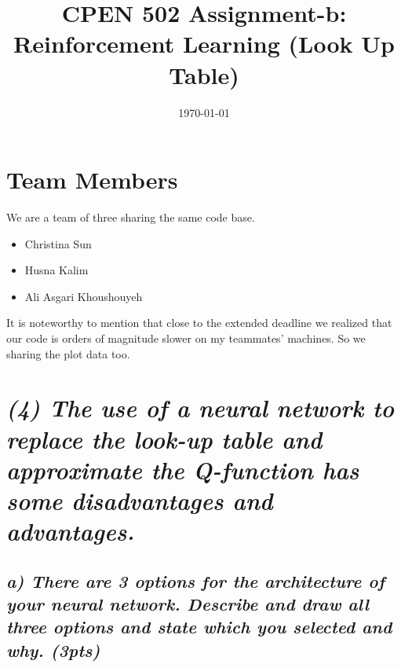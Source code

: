 \documentclass[a4paper,12pt]{article}
\title{CPEN 502 Assignment-b: Reinforcement Learning (Look Up Table)}
\author{\authorName}
\date{\today}
\begin{document}
\maketitle

\section*{Team Members}
We are a team of three sharing the same code base. 
\begin{itemize}
\item Christina Sun
\item Husna Kalim
\item Ali Asgari Khoushouyeh
\end{itemize}


It is noteworthy to mention that close to the extended deadline we realized that our code is orders of magnitude slower on my teammates' machines. So we sharing the plot data too. 
\pagebreak
\section*{\emph{(4) The use of a neural network to replace the look-up table and approximate the Q-function has some disadvantages and advantages.}}
\subsection*{\emph{a) There are 3 options for the architecture of your neural network. Describe and draw all three options and state which you selected and why. (3pts)}}
\end{document}
